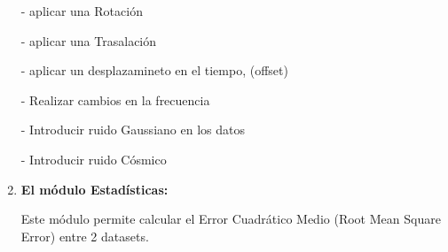 \begin{enumerate}
		- aplicar una Rotación

		- aplicar una Trasalación

		- aplicar un desplazamineto en el tiempo, (offset)

        - Realizar cambios en la frecuencia

        - Introducir ruido Gaussiano en los datos

        - Introducir ruido Cósmico


\item \textbf{El módulo Estadísticas:}

	Este módulo permite calcular el Error Cuadrático Medio (Root Mean Square Error) entre 2 datasets.

\end{enumerate}



